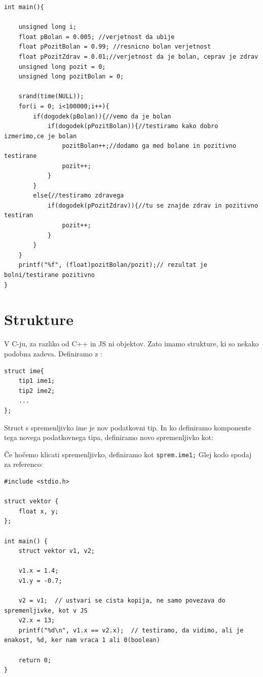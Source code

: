 \documentclass[a4paper, 12pt]{article}
\begin{document}
\begin{lstlisting}
int main(){

    unsigned long i;
	float pBolan = 0.005; //verjetnost da ubije
	float pPozitBolan = 0.99; //resnicno bolan verjetnost
	float pPozitZdrav = 0.01;//verjetnost da je bolan, ceprav je zdrav
	unsigned long pozit = 0;
	unsigned long pozitBolan = 0;
	
	srand(time(NULL));
	for(i = 0; i<100000;i++){
		if(dogodek(pBolan)){//vemo da je bolan
			if(dogodek(pPozitBolan)){//testiramo kako dobro izmerimo,ce je bolan
				pozitBolan++;//dodamo ga med bolane in pozitivno testirane
				pozit++;
			}
		}
		else{//testiramo zdravega
			if(dogodek(pPozitZdrav)){//tu se znajde zdrav in pozitivno testiran
				pozit++;
			}
		}
	}
	printf("%f", (float)pozitBolan/pozit);// rezultat je bolni/testirane pozitivno
}
\end{lstlisting}

\section{Strukture}

V C-ju, za razliko od C++ in JS ni objektov. Zato imamo strukture, ki so nekako podobna zadeva. Definiramo z :
\begin{lstlisting}
struct ime{
	tip1 ime1;
	tip2 ime2;
	...
};
\end{lstlisting}
Struct s spremenljivko ime je nov podatkovni tip. In ko definiramo komponente tega novega podatkovnega tipa, definiramo novo spremenljivko kot:

Če hočemo klicati spremenljivko, definiramo kot \lstinline|sprem.ime1;| Glej kodo spodaj za referenco:

\begin{lstlisting}
#include <stdio.h>

struct vektor {
	float x, y;		
};

int main() {
	struct vektor v1, v2;

	v1.x = 1.4;	
	v1.y = -0.7;

	v2 = v1;  // ustvari se cista kopija, ne samo povezava do spremenljivke, kot v JS
	v2.x = 13;
	printf("%d\n", v1.x == v2.x);  // testiramo, da vidimo, ali je enakost, %d, ker nam vraca 1 ali 0(boolean)
	
	return 0;
}
\end{lstlisting}
\end{document}
